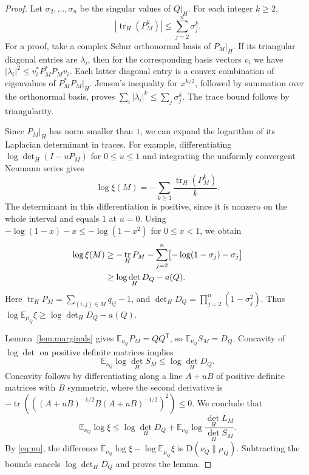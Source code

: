 \documentclass[11pt]{article}
\DeclareMathOperator{\tr}{tr}
\newcommand{\E}{\mathbb{E}}
\newcommand{\KL}{\mathrm{D}}
\newcommand{\trans}{\mathsf{T}}
\begin{document}
\begin{proof}
Let \(\sigma_2,\ldots,\sigma_n\) be the singular values of \(Q|_H\). For each integer \(k\ge2\),
\[
 |\tr_H(P_M^k)|\le\sum_{j=2}^n\sigma_j^k.
\]
For a proof, take a complex Schur orthonormal basis of \(P_M|_H\). If its triangular diagonal entries are \(\lambda_i\), then for the corresponding basis vectors \(v_i\) we have \(|\lambda_i|^2\le v_i^*P_M^*P_M v_i\). Each latter diagonal entry is a convex combination of eigenvalues of \(P_M^*P_M|_H\). Jensen's inequality for \(x^{k/2}\), followed by summation over the orthonormal basis, proves \(\sum_i|\lambda_i|^k\le\sum_j\sigma_j^k\). The trace bound follows by triangularity.

Since \(P_M|_H\) has norm smaller than \(1\), we can expand the logarithm of its Laplacian determinant in traces. For example, differentiating \(\log\det_H(I-u P_M)\) for \(0\le u\le1\) and integrating the uniformly convergent Neumann series gives
\[
 \log\xi(M)=-\sum_{k\ge1}\frac{\tr_H(P_M^k)}{k}.
\]
The determinant in this differentiation is positive, since it is nonzero on the whole interval and equals \(1\) at \(u=0\). Using \(-\log(1-x)-x\le-\log(1-x^2)\) for \(0\le x<1\), we obtain
\begin{align}
 \log\xi(M)
 &\ge -\tr_H P_M-\sum_{j=2}^n\bigl[-\log(1-\sigma_j)-\sigma_j\bigr]
 \notag\\
 &\ge \log\det_H D_Q-a(Q).
 \label{eq:xi-lower}
\end{align}
Here \(\tr_H P_M=\sum_{(i,j)\in M}q_{ij}-1\), and \(\det_H D_Q=\prod_{j=2}^n(1-\sigma_j^2)\). Thus \(\log\E_{\mu_Q}\xi\ge\log\det_H D_Q-a(Q)\).

Lemma~\ref{lem:marginals} gives \(\E_{\nu_Q}P_M=QQ^{\trans}\), so \(\E_{\nu_Q}S_M=D_Q\). Concavity of \(\log\det\) on positive definite matrices implies
\[
 \E_{\nu_Q}\log\det_H S_M\le \log\det_H D_Q.
\]
Concavity follows by differentiating along a line \(A+uB\) of positive definite matrices with \(B\) symmetric, where the second derivative is
\(-\tr(((A+uB)^{-1/2}B(A+uB)^{-1/2})^2)\le0\).
We conclude that
\[
 \E_{\nu_Q}\log\xi
 \le \log\det_H D_Q+\E_{\nu_Q}\log\frac{\det_H L_M}{\det_H S_M}.
\]
By \eqref{eq:nu}, the difference \(\E_{\nu_Q}\log\xi-\log\E_{\mu_Q}\xi\) is \(\KL(\nu_Q\|\mu_Q)\). Subtracting the bounds cancels \(\log\det_H D_Q\) and proves the lemma.
\end{proof}
\end{document}
